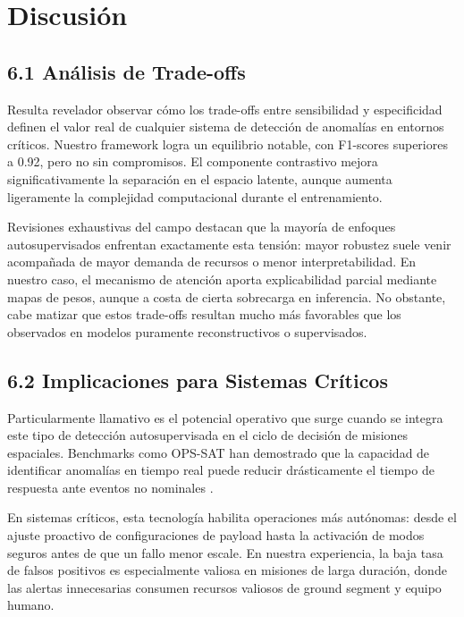 \section{Discusión}

\subsection{6.1 Análisis de Trade-offs}

Resulta revelador observar cómo los trade-offs entre sensibilidad y especificidad definen el valor real de cualquier sistema de detección de anomalías en entornos críticos. Nuestro framework logra un equilibrio notable, con F1-scores superiores a 0.92, pero no sin compromisos. El componente contrastivo mejora significativamente la separación en el espacio latente, aunque aumenta ligeramente la complejidad computacional durante el entrenamiento.

Revisiones exhaustivas del campo \cite{Fejjari2025_Review} destacan que la mayoría de enfoques autosupervisados enfrentan exactamente esta tensión: mayor robustez suele venir acompañada de mayor demanda de recursos o menor interpretabilidad. En nuestro caso, el mecanismo de atención aporta explicabilidad parcial mediante mapas de pesos, aunque a costa de cierta sobrecarga en inferencia. No obstante, cabe matizar que estos trade-offs resultan mucho más favorables que los observados en modelos puramente reconstructivos o supervisados.

\subsection{6.2 Implicaciones para Sistemas Críticos}

Particularmente llamativo es el potencial operativo que surge cuando se integra este tipo de detección autosupervisada en el ciclo de decisión de misiones espaciales. Benchmarks como OPS-SAT han demostrado que la capacidad de identificar anomalías en tiempo real puede reducir drásticamente el tiempo de respuesta ante eventos no nominales \cite{Ruszczak2025_OPSSAT}.

En sistemas críticos, esta tecnología habilita operaciones más autónomas: desde el ajuste proactivo de configuraciones de payload hasta la activación de modos seguros antes de que un fallo menor escale. En nuestra experiencia, la baja tasa de falsos positivos es especialmente valiosa en misiones de larga duración, donde las alertas innecesarias consumen recursos valiosos de ground segment y equipo humano.


